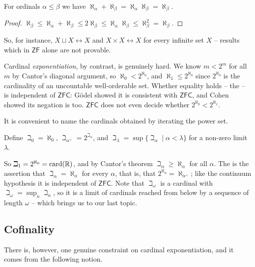 \documentclass[a4paper]{scrartcl}
\newcommand{\card}{\operatorname{card}}
\newcommand{\ZF}{\mathsf{ZF}}
\newcommand{\ZFC}{\mathsf{ZFC}}
\begin{document}
\begin{corollary}
  For ordinals $\alpha \leq \beta$ we have $\aleph_\alpha + \aleph_\beta = \aleph_\alpha \aleph_\beta = \aleph_\beta$.
\end{corollary}
\begin{proof}
  $\aleph_\beta \leq \aleph_\alpha+\aleph_\beta \leq 2 \aleph_\beta \leq \aleph_\alpha \aleph_\beta \leq \aleph_\beta^2=\aleph_\beta$.
\end{proof}

So, for instance, $X \sqcup X \leftrightarrow X$ and $X \times X \leftrightarrow X$ for every infinite set $X$ -- results which in $\ZF$ alone are not provable.

Cardinal \emph{exponentiation}, by contrast, is genuinely hard. We know $m < 2^m$ for all $m$ by Cantor's diagonal argument, so $\aleph_0 < 2^{\aleph_0}$, and $\aleph_1 \leq 2^{\aleph_0}$ since $2^{\aleph_0}$ is the cardinality of an uncountable well-orderable set. Whether equality holds -- the  -- is independent of $\ZFC$: G\"odel showed it is consistent with $\ZFC$, and Cohen showed its negation is too. $\ZFC$ does not even decide whether $2^{\aleph_0} < 2^{\aleph_1}$.

It is convenient to name the cardinals obtained by iterating the power set.

\begin{definition}
  Define $\beth_0 = \aleph_0$, $\beth_{\alpha^+} = 2^{\beth_\alpha}$, and $\beth_\lambda = \sup\{\beth_\alpha \mid \alpha < \lambda\}$ for a non-zero limit $\lambda$.
\end{definition}

So $\beth_1 = 2^{\aleph_0} = \card(\R)$, and by Cantor's theorem $\beth_\alpha \geq \aleph_\alpha$ for all $\alpha$. The  is the assertion that $\beth_\alpha = \aleph_\alpha$ for every $\alpha$, that is, that $2^{\aleph_\alpha} = \aleph_{\alpha^+}$; like the continuum hypothesis it is independent of $\ZFC$. Note that $\beth_\omega$ is a cardinal with $\beth_\omega = \sup_n \beth_n$, so it is a limit of cardinals reached from below by a sequence of length $\omega$ -- which brings us to our last topic.

\subsection{Cofinality}

There is, however, one genuine constraint on cardinal exponentiation, and it comes from the following notion.
\end{document}
